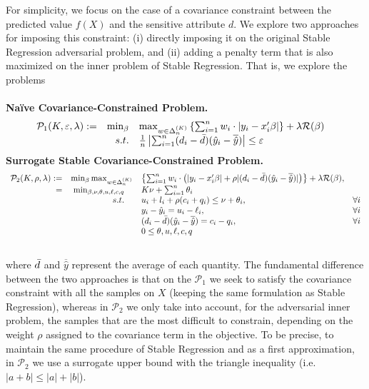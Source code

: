 \documentclass{article}
\renewcommand{\P}{\mathcal{P}}
\begin{document}
For simplicity, we focus on the case of a covariance constraint between the predicted value $f(X)$ and the sensitive attribute $d$. We explore two approaches for imposing this constraint: (i) directly imposing it on the original Stable Regression adversarial problem, and (ii) adding a penalty term that is also maximized on the inner problem of Stable Regression. That is, we explore the problems\\\\
\textbf{Naïve Covariance-Constrained Problem.}
{\everymath{\displaystyle}
\begin{align*}
    \begin{array}{rrll}
    \P_1(K, \varepsilon, \lambda):=&  \min_{\beta}  & \max_{w\in \Delta_{n}^{(K)}} \left\{ \sum_{i=1}^n w_i \cdot|y_i - x_i'\beta| \right\} + \lambda \mathcal{R}(\beta) &  \\
         & s.t. & \frac{1}{n}\left| \sum_{i=1}^n(d_i - \Bar{d})(\hat{y}_i - \overline{\hat{y}}) \right| \leq \varepsilon
    \end{array}
\end{align*}
\textbf{Surrogate Stable Covariance-Constrained Problem.}
\begin{align*}
    \begin{array}{rrll}
    \P_2(K, \rho, \lambda):=&  \min_{\beta} \max_{w\in \Delta_{n}^{(K)}} & \left\{ \sum_{i=1}^n w_i \cdot\left(|y_i - x_i'\beta| + \rho|(d_i - \Bar{d})(\hat{y}_i - \overline{\hat{y}})| \right)\right\} + \lambda \mathcal{R}(\beta), & \\
    =& \min_{\beta, \nu, \theta, u,\ell,c,q} \quad & K\nu + \sum_{i=1}^n \theta_i \\
    & s.t. \quad  & u_i + l_i + \rho (c_i + q_i) \leq \nu + \theta_i,& \forall i  \\
    &   & y_i - \hat{y}_i = u_i - \ell_i, & \forall i  \\
    && (d_i - \Bar{d})(\hat{y}_i - \overline{\hat{y}}) = c_i - q_i, & \forall i\\
   && 0 \leq \theta, u, \ell, c, q \\
   & & 
    \end{array}
\end{align*}}

\noindent where $\Bar{d}$ and $\overline{\hat{y}}$ represent the average of each quantity. The fundamental difference between the two approaches is that on the $\P_1$ we seek to satisfy the covariance constraint with all the samples on $X$ (keeping the same formulation as Stable Regression), whereas in $\P_2$ we only take into account, for the adversarial inner problem, the samples that are the most difficult to constrain, depending on the weight $\rho$ assigned to the covariance term in the objective. To be precise, to maintain the same procedure of Stable Regression and as a first approximation, in $\P_2$ we use a surrogate upper bound with the triangle inequality (i.e. $|a+b|\leq |a| + |b|$).
\end{document}
